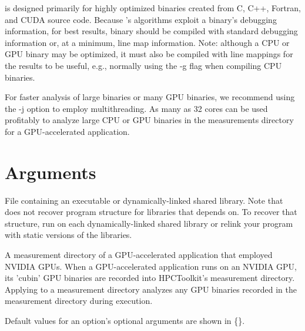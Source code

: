 \documentclass[english]{article}
\begin{document}
 is designed primarily for highly optimized binaries created from
C, C++, Fortran, and CUDA source code. Because 's algorithms exploit a
binary's debugging information, for best results, binary should be compiled
with standard debugging information or, at a minimum, line map information.
Note: although a CPU or GPU binary may be optimized, it must also be
compiled with line mappings for the results to be useful, e.g., normally using the -g
flag when compiling CPU binaries. 

For faster analysis of large binaries or many GPU binaries, we recommend using
the -j option to employ multithreading. As many as 32 cores can be used profitably
to analyze large CPU or GPU binaries in the measurements directory for a
GPU-accelerated application.


\section{Arguments}


\begin{Description}
\item[\Arg{binary}] File containing an executable or dynamically-linked shared library.
Note that  does not recover program structure for libraries that  depends on.
To recover that structure, run  on each dynamically-linked shared library
or relink your program with static versions of the libraries.

\item[\Arg{measurement directory of GPU-accelerated application}] 
A measurement directory of a GPU-accelerated application that employed NVIDIA GPUs.
When a GPU-accelerated application runs on an NVIDIA GPU, its 'cubin' GPU binaries are recorded into 
HPCToolkit's measurement directory.
Applying  to a measurement directory analyzes any GPU binaries recorded 
in the measurement directory during execution. 

\end{Description}

Default values for an option's optional arguments are shown in \{\}.
\end{document}
